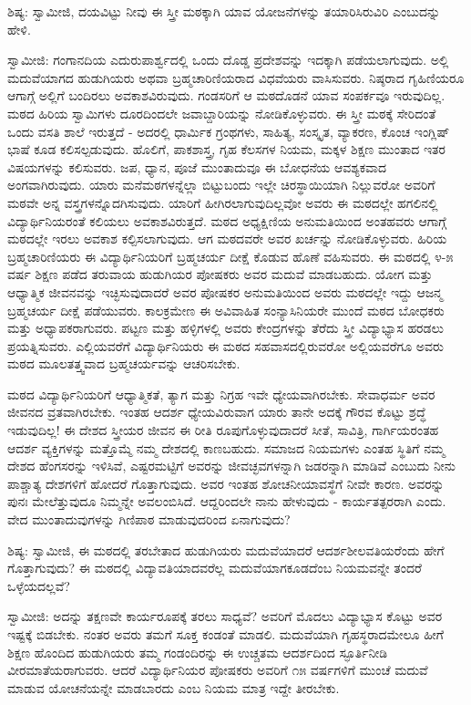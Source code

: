 ಶಿಷ್ಯ: ಸ್ವಾಮೀಜಿ, ದಯವಿಟ್ಟು ನೀವು ಈ ಸ್ತ್ರೀ ಮಠಕ್ಕಾಗಿ ಯಾವ ಯೋಜನೆಗಳನ್ನು ತಯಾರಿಸಿರುವಿರಿ ಎಂಬುದನ್ನು ಹೇಳಿ.

ಸ್ವಾಮೀಜಿ: ಗಂಗಾನದಿಯ ಎದುರುಪಾರ್ಶ್ವದಲ್ಲಿ ಒಂದು ದೊಡ್ಡ ಪ್ರದೇಶವನ್ನು ಇದಕ್ಕಾಗಿ ಪಡೆಯಲಾಗುವುದು. ಅಲ್ಲಿ ಮದುವೆಯಾಗದ ಹುಡುಗಿಯರು ಅಥವಾ ಬ್ರಹ್ಮಚಾರಿಣಿಯರಾದ ವಿಧವೆಯರು ವಾಸಿಸುವರು. ನಿಷ್ಠರಾದ ಗೃಹಿಣಿಯರೂ ಆಗಾಗ್ಗೆ ಅಲ್ಲಿಗೆ ಬಂದಿರಲು ಅವಕಾಶವಿರುವುದು. ಗಂಡಸರಿಗೆ ಆ ಮಠದೊಡನೆ ಯಾವ ಸಂಪರ್ಕವೂ ಇರುವುದಿಲ್ಲ. ಮಠದ ಹಿರಿಯ ಸ್ವಾಮಿಗಳು ದೂರದಿಂದಲೇ ಜವಾಬ್ದಾರಿಯನ್ನು ನೋಡಿಕೊಳ್ಳುವರು. ಈ ಸ್ತ್ರೀ ಮಠಕ್ಕೆ ಸೇರಿದಂತೆ ಒಂದು ವಸತಿ ಶಾಲೆ ಇರುತ್ತದೆ - ಅದರಲ್ಲಿ ಧಾರ್ಮಿಕ ಗ್ರಂಥಗಳು, ಸಾಹಿತ್ಯ, ಸಂಸ್ಕೃತ, ವ್ಯಾಕರಣ, ಕೊಂಚ ಇಂಗ್ಲಿಷ್ ಭಾಷೆ ಕೂಡ ಕಲಿಸಲ್ಪಡುವುದು. ಹೊಲಿಗೆ, ಪಾಕಶಾಸ್ತ್ರ, ಗೃಹ ಕೆಲಸಗಳ ನಿಯಮ, ಮಕ್ಕಳ ಶಿಕ್ಷಣ ಮುಂತಾದ ಇತರ ವಿಷಯಗಳನ್ನು ಕಲಿಸುವರು. ಜಪ, ಧ್ಯಾನ, ಪೂಜೆ ಮುಂತಾದುವೂ ಈ ಬೋಧನೆಯ ಆವಶ್ಯಕವಾದ ಅಂಗವಾಗಿರುವುದು. ಯಾರು ಮನೆಮಠಗಳನ್ನೆಲ್ಲಾ ಬಿಟ್ಟುಬಂದು ಇಲ್ಲೇ ಚಿರಸ್ಥಾಯಿಯಾಗಿ ನಿಲ್ಲುವರೋ ಅವರಿಗೆ ಮಠವೇ ಅನ್ನ ವಸ್ತ್ರಗಳನ್ನೊದಗಿಸುವುದು. ಯಾರಿಗೆ ಹೀಗಿರಲಾಗುವುದಿಲ್ಲವೋ ಅವರು ಈ ಮಠದಲ್ಲೇ ಹಗಲಿನಲ್ಲಿ ವಿದ್ಯಾರ್ಥಿನಿಯರಂತೆ ಕಲಿಯಲು ಅವಕಾಶವಿರುತ್ತದೆ. ಮಠದ ಅಧ್ಯಕ್ಷಿಣಿಯ ಅನುಮತಿಯಿಂದ ಅಂತಹವರು ಆಗಾಗ್ಗೆ ಮಠದಲ್ಲೇ ಇರಲು ಅವಕಾಶ ಕಲ್ಪಿಸಲಾಗುವುದು. ಆಗ ಮಠದವರೇ ಅವರ ಖರ್ಚನ್ನು ನೋಡಿಕೊಳ್ಳುವರು. ಹಿರಿಯ ಬ್ರಹ್ಮಚಾರಿಣಿಯರು ಈ ವಿದ್ಯಾರ್ಥಿನಿಯರಿಗೆ ಬ್ರಹ್ಮಚರ್ಯ ದೀಕ್ಷೆ ಕೊಡುವ ಹೊಣೆ ವಹಿಸುವರು. ಈ ಮಠದಲ್ಲಿ ೪-೫ ವರ್ಷ ಶಿಕ್ಷಣ ಪಡೆದ ತರುವಾಯ ಹುಡುಗಿಯರ ಪೋಷಕರು ಅವರ ಮದುವೆ ಮಾಡಬಹುದು. ಯೋಗ ಮತ್ತು ಆಧ್ಯಾತ್ಮಿಕ ಜೀವನವನ್ನು ಇಚ್ಛಿಸುವುದಾದರೆ ಅವರ ಪೋಷಕರ ಅನುಮತಿಯಿಂದ ಅವರು ಮಠದಲ್ಲೇ ಇದ್ದು ಆಜನ್ಮ ಬ್ರಹ್ಮಚರ್ಯ ದೀಕ್ಷೆ ಪಡೆಯುವರು. ಕಾಲಕ್ರಮೇಣ ಈ ಅವಿವಾಹಿತ ಸಂನ್ಯಾಸಿನಿಯರೇ ಮುಂದೆ ಮಠದ ಬೋಧಕರು ಮತ್ತು ಅಧ್ಯಾಪಕರಾಗುವರು. ಪಟ್ಟಣ ಮತ್ತು ಹಳ್ಳಿಗಳಲ್ಲಿ ಅವರು ಕೇಂದ್ರಗಳನ್ನು ತೆರೆದು ಸ್ತ್ರೀ ವಿದ್ಯಾಭ್ಯಾಸ ಹರಡಲು ಪ್ರಯತ್ನಿಸುವರು. ಎಲ್ಲಿಯವರೆಗೆ ವಿದ್ಯಾರ್ಥಿನಿಯರು ಈ ಮಠದ ಸಹವಾಸದಲ್ಲಿರುವರೋ ಅಲ್ಲಿಯವರೆಗೂ ಅವರು ಮಠದ ಮೂಲತತ್ತ್ವವಾದ ಬ್ರಹ್ಮಚರ್ಯವನ್ನು ಆಚರಿಸಬೇಕು.

ಮಠದ ವಿದ್ಯಾರ್ಥಿನಿಯರಿಗೆ ಆಧ್ಯಾತ್ಮಿಕತೆ, ತ್ಯಾಗ ಮತ್ತು ನಿಗ್ರಹ ಇವೇ ಧ್ಯೇಯವಾಗಿರಬೇಕು. ಸೇವಾಧರ್ಮ ಅವರ ಜೀವನದ ವ್ರತವಾಗಿರಬೇಕು. ಇಂತಹ ಆದರ್ಶ ಧ್ಯೇಯವಿರುವಾಗ ಯಾರು ತಾನೇ ಅದಕ್ಕೆ ಗೌರವ ಕೊಟ್ಟು ಶ್ರದ್ಧೆ ಇಡುವುದಿಲ್ಲ! ಈ ದೇಶದ ಸ್ತ್ರೀಯರ ಜೀವನ ಈ ರೀತಿ ರೂಪುಗೊಳ್ಳುವುದಾದರೆ ಸೀತೆ, ಸಾವಿತ್ರಿ, ಗಾರ್ಗಿಯರಂತಹ ಆದರ್ಶ ವ್ಯಕ್ತಿಗಳನ್ನು ಮತ್ತೊಮ್ಮೆ ನಮ್ಮ ದೇಶದಲ್ಲಿ ಕಾಣಬಹುದು. ಸಮಾಜದ ನಿಯಮಗಳು ಎಂತಹ ಸ್ಥಿತಿಗೆ ನಮ್ಮ ದೇಶದ ಹೆಂಗಸರನ್ನು ಇಳಿಸಿವೆ, ಎಷ್ಟರಮಟ್ಟಿಗೆ ಅವರನ್ನು ಜೀವಚ್ಛವಗಳನ್ನಾಗಿ ಜಡರನ್ನಾಗಿ ಮಾಡಿವೆ ಎಂಬುದು ನೀನು ಪಾಶ್ಚಾತ್ಯ ದೇಶಗಳಿಗೆ ಹೋದರೆ ಗೊತ್ತಾಗುವುದು. ಅವರ ಇಂತಹ ಶೋಚನೀಯಾವಸ್ಥೆಗೆ ನೀವೇ ಕಾರಣ. ಅವರನ್ನು ಪುನಃ ಮೇಲೆತ್ತುವುದೂ ನಿಮ್ಮನ್ನೇ ಅವಲಂಬಿಸಿದೆ. ಆದ್ದರಿಂದಲೇ ನಾನು ಹೇಳುವುದು - ಕಾರ್ಯತತ್ಪರರಾಗಿ ಎಂದು. ವೇದ ಮುಂತಾದುವುಗಳನ್ನು ಗಿಣಿಪಾಠ ಮಾಡುವುದರಿಂದ ಏನಾಗುವುದು?

ಶಿಷ್ಯ: ಸ್ವಾಮೀಜಿ, ಈ ಮಠದಲ್ಲಿ ತರಬೇತಾದ ಹುಡುಗಿಯರು ಮದುವೆಯಾದರೆ ಆದರ್ಶಶೀಲವತಿಯರೆಂದು ಹೇಗೆ ಗೊತ್ತಾಗುವುದು? ಈ ಮಠದಲ್ಲಿ ವಿದ್ಯಾವತಿಯಾದವರೆಲ್ಲ ಮದುವೆಯಾಗಕೂಡದೆಂಬ ನಿಯಮವನ್ನೇ ತಂದರೆ ಒಳ್ಳೆಯದಲ್ಲವೆ?

ಸ್ವಾಮೀಜಿ: ಅದನ್ನು ತಕ್ಷಣವೇ ಕಾರ್ಯರೂಪಕ್ಕೆ ತರಲು ಸಾಧ್ಯವೆ? ಅವರಿಗೆ ಮೊದಲು ವಿದ್ಯಾಭ್ಯಾಸ ಕೊಟ್ಟು ಅವರ ಇಷ್ಟಕ್ಕೆ ಬಿಡಬೇಕು. ನಂತರ ಅವರು ತಮಗೆ ಸೂಕ್ತ ಕಂಡಂತೆ ಮಾಡಲಿ. ಮದುವೆಯಾಗಿ ಗೃಹಸ್ಥರಾದಮೇಲೂ ಹೀಗೆ ಶಿಕ್ಷಣ ಹೊಂದಿದ ಹುಡುಗಿಯರು ತಮ್ಮ ಗಂಡಂದಿರನ್ನು ಈ ಉಚ್ಚತಮ ಆದರ್ಶದಿಂದ ಸ್ಫೂರ್ತಿನೀಡಿ ವೀರಮಾತೆಯರಾಗುವರು. ಆದರೆ ವಿದ್ಯಾರ್ಥಿನಿಯರ ಪೋಷಕರು ಅವರಿಗೆ ೧೫ ವರ್ಷಗಳಿಗೆ ಮುಂಚೆ ಮದುವೆ ಮಾಡುವ ಯೋಚನೆಯನ್ನೇ ಮಾಡಬಾರದು ಎಂಬ ನಿಯಮ ಮಾತ್ರ ಇದ್ದೇ ತೀರಬೇಕು.

